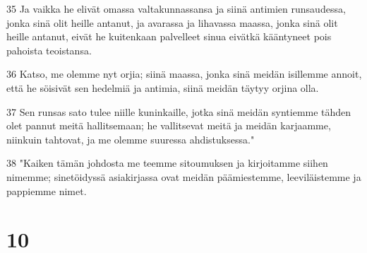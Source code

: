 \par 35 Ja vaikka he elivät omassa valtakunnassansa ja siinä antimien runsaudessa, jonka sinä olit heille antanut, ja avarassa ja lihavassa maassa, jonka sinä olit heille antanut, eivät he kuitenkaan palvelleet sinua eivätkä kääntyneet pois pahoista teoistansa.
\par 36 Katso, me olemme nyt orjia; siinä maassa, jonka sinä meidän isillemme annoit, että he söisivät sen hedelmiä ja antimia, siinä meidän täytyy orjina olla.
\par 37 Sen runsas sato tulee niille kuninkaille, jotka sinä meidän syntiemme tähden olet pannut meitä hallitsemaan; he vallitsevat meitä ja meidän karjaamme, niinkuin tahtovat, ja me olemme suuressa ahdistuksessa."
\par 38 "Kaiken tämän johdosta me teemme sitoumuksen ja kirjoitamme siihen nimemme; sinetöidyssä asiakirjassa ovat meidän päämiestemme, leeviläistemme ja pappiemme nimet.

\chapter{10}

